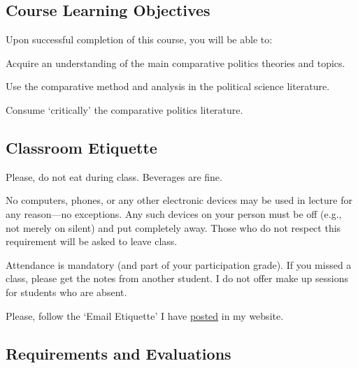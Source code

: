 \documentclass[letterpaper]{article}
\renewenvironment{itemize}{
  \begin{list}{}{
    \setlength{\leftmargin}{1.5em}
  }
}{
  \end{list}
}
\begin{document}
\subsection*{Course Learning Objectives}
 
Upon successful completion of this course, you will be able to:

\begin{itemize}
	\item[$\bullet$] Acquire an understanding of the main comparative politics theories and topics.
	\item[$\bullet$] Use the comparative method and analysis in the political science literature.
	\item[$\bullet$] Consume `critically' the comparative politics literature.
\end{itemize}


\subsection*{Classroom Etiquette}
 

\begin{itemize}
	\item[$\bullet$] Please, do not eat during class. Beverages are fine.
	\item[$\bullet$] No computers, phones, or any other electronic devices may be used in lecture for any reason---no exceptions. Any such devices on your person must be off (e.g., not merely on silent) and put completely away. Those who do not respect this requirement will be asked to leave class.
	\item[$\bullet$] Attendance is mandatory (and part of your participation grade). If you missed a class, please get the notes from another student. I do not offer make up sessions for students who are absent.
	\item[$\bullet$] Please, follow the `Email Etiquette' I have \href{http://www.hectorbahamonde.com/resources/}{posted} in my website.
\end{itemize}



\subsection*{Requirements and Evaluations}
\end{document}
